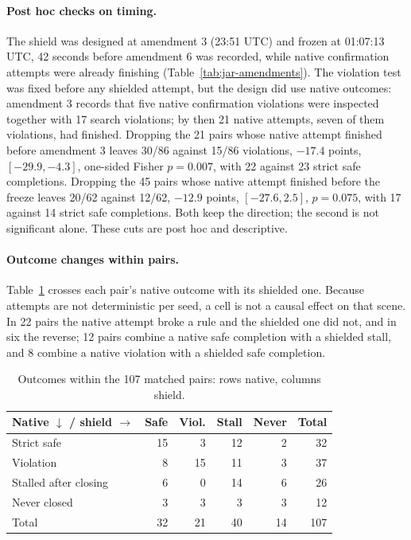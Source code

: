 \paragraph{Post hoc checks on timing.} The shield was designed at amendment 3
(23:51 UTC) and frozen at 01:07:13 UTC, 42 seconds before amendment 6 was
recorded, while native confirmation
attempts were already finishing (Table~\ref{tab:jar-amendments}). The violation test was fixed before any shielded attempt, but the design did
use native outcomes: amendment 3 records that five native confirmation violations were inspected
together with 17 search violations; by then 21 native attempts, seven of them
violations, had finished. Dropping the 21 pairs whose native
attempt finished before amendment 3 leaves 30/86 against 15/86 violations,
$-17.4$ points, $[-29.9,-4.3]$, one-sided Fisher $p=0.007$, with 22 against 23
strict safe completions. Dropping the 45 pairs whose native attempt finished
before the freeze leaves 20/62 against 12/62, $-12.9$ points, $[-27.6,2.5]$,
$p=0.075$, with 17 against 14 strict safe completions. Both keep the
direction; the second is not significant alone. These cuts are post hoc and
descriptive.

\paragraph{Outcome changes within pairs.} Table~\ref{tab:jar-transitions}
crosses each pair's native outcome with its shielded one. Because attempts
are not deterministic per seed, a cell is not a causal effect on that
scene. In 22 pairs the native attempt broke a rule and the shielded one did not, and
in six the reverse; 12 pairs combine a native safe completion with a shielded
stall, and 8 combine a native violation with a shielded safe completion.

\begin{table}[t]
\caption{Outcomes within the 107 matched pairs: rows native, columns shield.}
\label{tab:jar-transitions}\centering\small
\begin{tabular}{lrrrrr}
\toprule
Native $\downarrow$ / shield $\rightarrow$ & Safe & Viol. & Stall & Never & Total \\
\midrule
Strict safe & 15 & 3 & 12 & 2 & 32 \\
Violation & 8 & 15 & 11 & 3 & 37 \\
Stalled after closing & 6 & 0 & 14 & 6 & 26 \\
Never closed & 3 & 3 & 3 & 3 & 12 \\
\midrule
Total & 32 & 21 & 40 & 14 & 107 \\
\bottomrule
\end{tabular}
\end{table}

